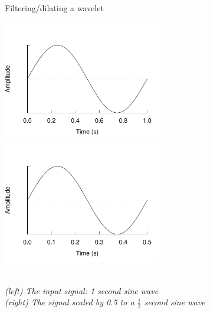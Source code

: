 \begin{figure}[h]
\caption{Filtering/dilating a wavelet}\label{figure:filtering}
\caption*{\\[1em]\footnotesize\emph{(left) The input signal: 1 second sine
wave\\ (right) The signal scaled by 0.5 to a $\frac{1}{2}$ second sine wave}\rm}
\centering
	\includegraphics[width=196pt]{images/sine_full.pdf}
	\hspace{1em}
	\includegraphics[width=196pt]{images/sine_scaled.pdf}
\end{figure}